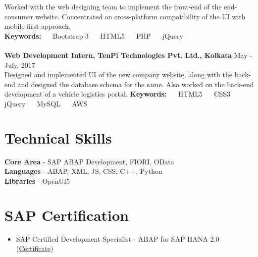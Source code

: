 \documentclass[margin, centered, a4paper]{res}
\begin{document}
\begin{resume}
Worked with the web designing team to implement the front-end of the end-consumer website. Concentrated on cross-platform compatibility of the UI with mobile-first approach.\\
\textbf{Keywords:} ~\textbullet~ Bootstrap 3 ~\textbullet~ HTML5 ~\textbullet~ PHP ~\textbullet~ jQuery\\
\\
\textbf{Web Development Intern, TenPi Technologies Pvt. Ltd., Kolkata} \hfill May - July, 2017\\
Designed and implemented UI of the new company website, along with the back-end and designed the database schema for the same. Also worked on the back-end development of a vehicle logistics portal.
\textbf{Keywords:} ~\textbullet~ HTML5 ~\textbullet~ CSS3 ~\textbullet~ jQuery ~\textbullet~ MySQL ~\textbullet~ AWS

\section{Technical Skills}
\textbf{Core Area} - SAP ABAP Development, FIORI, OData\\
\textbf{Languages} - ABAP, XML, JS, CSS, C++, Python\\
\textbf{Libraries} - OpenUI5

\section{SAP Certification}
\begin{itemize}[leftmargin=*]
	\item SAP Certified Development Specialist - ABAP for SAP HANA 2.0 (\href{https://www.credly.com/badges/d9bd5516-f33f-44ec-ac7a-fdfcbd94b768/public_url}{Certificate})
\end{itemize}


\end{resume}
\end{document}
